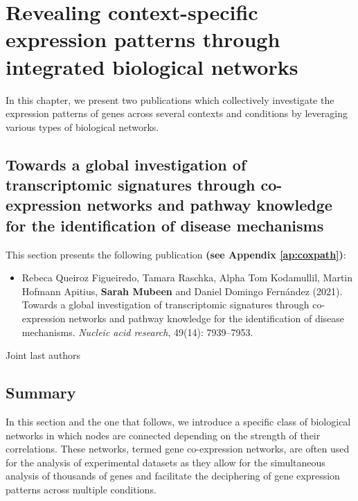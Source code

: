 \chapter{Revealing context-specific expression patterns through integrated biological networks}
\label{ch:contexts}

In this chapter, we present two publications which collectively investigate the expression patterns of genes across several contexts and conditions by leveraging various types of biological networks.


\section{Towards a global investigation of transcriptomic signatures through co-expression networks and pathway knowledge for the identification of disease mechanisms}

\label{ch:coxpath}

This section presents the following publication \textbf{(see Appendix \ref{ap:coxpath})}:

\begin{itemize}

\item[] Rebeca Queiroz Figueiredo, Tamara Raschka, Alpha Tom Kodamullil, Martin Hofmann Apitius, \textbf{Sarah Mubeen}\textsuperscript{\textdagger} and Daniel Domingo Fernández\textsuperscript{\textdagger} (2021). Towards a global investigation of transcriptomic signatures through co-expression networks and pathway knowledge for the identification of disease mechanisms. \textit{Nucleic acid research}, 49(14): 7939–7953.

\end{itemize}
\textsuperscript{\textdagger} Joint last authors

\section*{Summary}

In this section and the one that follows, we introduce a specific class of biological networks in which nodes are connected depending on the strength of their correlations. These networks, termed gene co-expression networks, are often used for the analysis of experimental datasets as they allow for the simultaneous analysis of thousands of genes and facilitate the deciphering of gene expression patterns across multiple conditions. 

